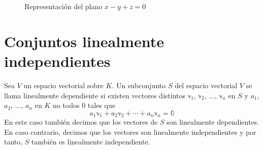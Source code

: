 \begin{example}
\begin{figure}[h!]
        \caption{Representación del plano $x - y + z = 0$}
    \end{figure}
\end{example}

\section{Conjuntos linealmente independientes}

\begin{definition}
    Sea $V$ un espacio vectorial sobre $K$. Un subconjunto $S$ del espacio vectorial $V$ se llama linealmente dependiente si existen vectores distintos $\mathbb{v}_1$, $\mathbb{v}_2$, $\dots$, $\mathbb{v}_n$ en $S$ y $a_1$, $a_2$, $\dots$, $a_n$ en $K$ no todos $0$ tales que
    $$a_1 \mathbb{v}_1 + a_2 \mathbb{v}_2 + \cdots + a_n \mathbb{v}_n = \mathbb{0}$$
    En este caso también decimos que los vectores de $S$ son linealmente dependientes. En caso contrario, decimos que los vectores son linealmente independientes y por tanto, $S$ también es linealmente independiente.
\end{definition}

